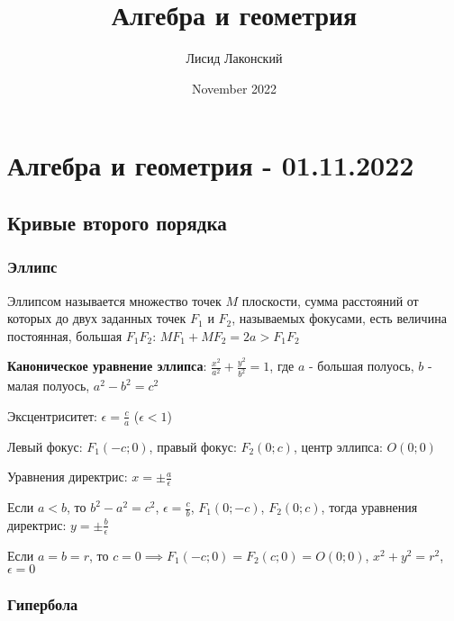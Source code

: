 \documentclass{article}
\title{Алгебра и геометрия}
\author{Лисид Лаконский}
\date{November 2022}
\begin{document}
\maketitle

\tableofcontents
\pagebreak

\section{Алгебра и геометрия - 01.11.2022}

\subsection{Кривые второго порядка}

\subsubsection{Эллипс}

\begin{flushleft}

Эллипсом называется множество точек $M$ плоскости, сумма расстояний от которых до двух заданных точек $F_1$ и $F_2$, называемых фокусами, есть величина постоянная, большая $F_1 F_2$: $M F_1 + M F_2 = 2a > F_1 F_2$

\hfill

\textbf{Каноническое уравнение эллипса}: $\frac{x^2}{a^2} + \frac{y^2}{b^2} = 1$, где $a$ - большая полуось, $b$ - малая полуось, $a^2 - b^2 = c^2$

\hfill

Эксцентриситет: $\epsilon = \frac{c}{a}$ ($\epsilon < 1$)

Левый фокус: $F_1(-c; 0)$, правый фокус: $F_2(0; c)$, центр эллипса: $O(0; 0)$

Уравнения директрис: $x = \pm \frac{a}{\epsilon}$

\hfill

Если $a < b$, то $b^2 - a^2 = c^2$, $\epsilon = \frac{c}{b}$, $F_1(0; -c)$, $F_2(0; c)$, тогда уравнения директрис: $y = \pm \frac{b}{\epsilon}$

Если $a = b = r$, то $c = 0 \implies F_1(-c; 0) = F_2(c; 0) = O(0; 0)$, $x^2 + y^2 = r^2$, $\epsilon = 0$

\end{flushleft}

\subsubsection{Гипербола}
\end{document}
